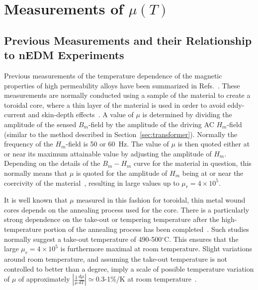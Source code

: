 


\section{Measurements of $\mu(T)$\label{sec:tdep}}

\subsection{Previous Measurements and their Relationship to nEDM
  Experiments\label{sec:previousmeasurement}}

Previous measurements of the temperature dependence of the magnetic
properties of high permeability alloys have been summarized in
Refs.~\cite{couderchon1982some,bozorth1993ferromagnetism,pfeifer1980soft}. These
measurements are normally conducted using a sample of the material to
create a toroidal core, where a thin layer of the material is used in
order to avoid eddy-current and skin-depth
effects~\cite{pfeifer1980soft,kruppvdm}. A value of $\mu$ is
determined by dividing the amplitude of the sensed $B_m$-field by the
amplitude of the driving AC $H_m$-field (similar to the method
described in Section~\ref{sec:transformer}). Normally the frequency
of the $H_m$-field is 50 or 60~Hz.  The value of $\mu$ is then quoted
either at or near its maximum attainable value by adjusting the
amplitude of $H_m$.  Depending on the details of the $B_m-H_m$ curve
for the material in question, this normally means that $\mu$ is quoted
for the amplitude of $H_m$ being at or near the coercivity of the
material~\cite{couderchon1982some,kruppvdm}, resulting in large values
up to $\mu_r=4\times 10^5$.

It is well known that $\mu$ measured in this fashion for toroidal,
thin metal wound cores depends on the annealing process used for the
core.  There is a particularly strong dependence on the take-out or
tempering temperature after the high-temperature portion of the
annealing process has been
completed~\cite{pfeifer1980soft,kruppvdm,couderchon1982some}. Such
studies normally suggest a take-out temperature of 490-500$^\circ$C.
This ensures that the large $\mu_r=4\times 10^{5}$ is furthermore
maximal at room temperature. Slight variations around room
temperature, and assuming the take-out temperature is not controlled
to better than a degree, imply a scale of possible temperature
variation of $\mu$ of approximately
$\left|\frac{1}{\mu}\frac{d\mu}{dT}\right|\simeq 0.3$-1\%/K at room
temperature~\cite{couderchon1982some,kruppvdm}.

